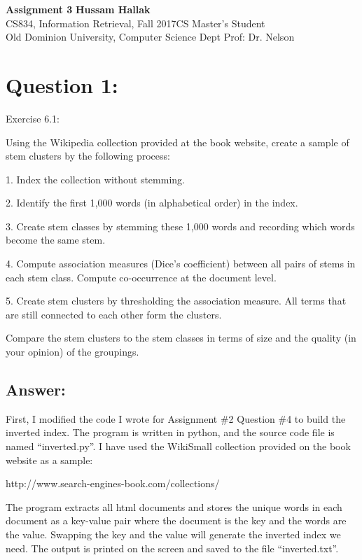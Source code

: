 \documentclass[a4paper, 11pt]{article}
\begin{document}
\noindent
\large\textbf{Assignment 3} \hfill \textbf{Hussam Hallak} \\
\normalsize CS834, Information Retrieval, Fall 2017\hfill CS Master's Student \\
Old Dominion University, Computer Science Dept \hfill Prof: Dr. Nelson 

\section*{Question 1:}
Exercise 6.1: 

Using the Wikipedia collection provided at the book website, create a sample of stem clusters by the following process:

1. Index the collection without stemming.

2. Identify the first 1,000 words (in alphabetical order) in the index.

3. Create stem classes by stemming these 1,000 words and recording which words become the same stem.

4. Compute association measures (Dice’s coefficient) between all pairs of stems in each stem class. Compute co-occurrence at the document level.

5. Create stem clusters by thresholding the association measure. All terms that are still connected to each other form the clusters.

Compare the stem clusters to the stem classes in terms of size and the quality (in
your opinion) of the groupings.



\subsection*{Answer:}
First, I modified the code I wrote for Assignment \#2 Question \#4 to build the inverted index. The program is written in python, and the source code file is named ``inverted.py''. I have used the WikiSmall collection provided on the book website as a sample:

http://www.search-engines-book.com/collections/

The program extracts all html documents and stores the unique words in each document as a key-value pair where
the document is the key and the words are the value. Swapping the key and the value will generate the inverted index we need. The output is printed on the screen and saved to the file ``inverted.txt''.
\end{document}
